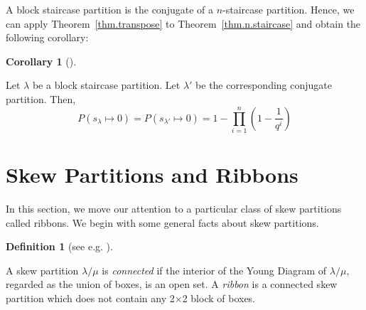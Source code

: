 \documentclass[numbers=enddot,12pt,final,onecolumn,notitlepage]{scrartcl}%
\theoremstyle{definition}
\newtheorem{defi}[theo]{Definition}
\newenvironment{definition}[1][]
{\begin{defi}[#1]\begin{leftbar}}
{\end{leftbar}\end{defi}}
\newtheorem{coro}[theo]{Corollary}
\newenvironment{corollary}[1][]
{\begin{coro}[#1]\begin{leftbar}}
{\end{leftbar}\end{coro}}
\newtheorem{exam}[theo]{Example}
\newenvironment{example}[1][]
{\begin{exam}[#1]\begin{leftbar}}
{\end{leftbar}\end{exam}}
\let\prodnonlimits\prod
\renewcommand{\prod}{\prodnonlimits\limits}
\theoremstyle{plainsl}
\begin{document}
A block staircase partition is the conjugate of a $n$-staircase partition.
Hence, we can apply Theorem~\ref{thm.transpose} to Theorem~\ref{thm.n.staircase}
and obtain the following corollary:

\begin{corollary}
Let $\lambda$ be a block staircase partition. Let $\lambda'$ be the corresponding conjugate partition. Then, 
\[
P(s_{\lambda} \longmapsto 0) = P(s_{\lambda'} \longmapsto 0) = 1-\prod_{i=1}^{n} \left(  1-\dfrac{1}{q^{i}}\right)
\]
\end{corollary}

\section{Skew Partitions and Ribbons}

In this section, we move our attention to a particular class of skew partitions called ribbons. We begin with some general facts about skew partitions.

\begin{definition}[see e.g. {\cite[\S7.17]{EC2}}]

A skew partition $\lambda/\mu$ is \emph{connected} if the interior of the Young Diagram of $\lambda/\mu$, regarded as the union of boxes, is an open set.
A \emph{ribbon} is a connected skew partition which does not contain any 2$\times$2 block of boxes. 

\end{definition}



\end{document}
